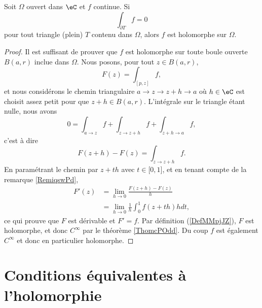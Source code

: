 \begin{proposition}   \label{ThoRckxes}
    Soit \( \Omega\) ouvert dans \( \eC\) et \( f\) continue. Si
    \begin{equation}
        \int_{\partial T}f=0
    \end{equation}
    pour tout triangle (plein) \( T\) contenu dans \( \Omega\), alors \( f\) est holomorphe sur \( \Omega\).
\end{proposition}

\begin{proof}
    Il est suffisant de prouver que \( f\) est holomorphe sur toute boule ouverte \( B(a,r)\) inclue dans \( \Omega\). Nous posons, pour tout \( z\in B(a,r)\),
    \begin{equation}
        F(z)=\int_{[p,z]}f,
    \end{equation}
    et nous considérons le chemin triangulaire \( a\to z\to z+h\to a\) où \( h\in \eC\) est choisit assez petit pour que \( z+h\in B(a,r)\). L'intégrale sur le triangle étant nulle, nous avons
    \begin{equation}
        0=\int_{a\to z}f+\int_{z\to z+h}f+\int_{z+h\to a}f,
    \end{equation}
    c'est à dire
    \begin{equation}
        F(z+h)-F(z)=\int_{z\to z+h}f.
    \end{equation}
    En paramétrant le chemin par \( z+th\) avec \( t\in\mathopen[ 0 , 1 \mathclose]\), et en tenant compte de la remarque \ref{RemiqswPd},
    \begin{subequations}
        \begin{align}
            F'(z)&=\lim_{h\to 0} \frac{ F(z+h)-F(z) }{ h }\\
            &=\lim_{h\to 0} \frac{1}{ h }\int_0^1f(z+th)hdt,
        \end{align}
    \end{subequations}
    ce qui prouve que \( F\) est dérivable et \( F'=f\). Par définition (\ref{DefMMpjJZ}), \( F\) est holomorphe, et donc \( C^{\infty}\) par le théorème \ref{ThomcPOdd}. Du coup \( f\) est également \(  C^{\infty}\) et donc en particulier holomorphe.
\end{proof}

\section{Conditions équivalentes à l'holomorphie}

